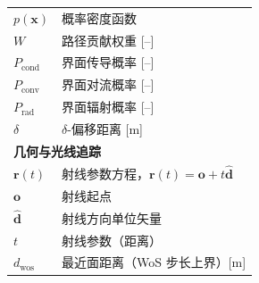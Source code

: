 \begin{appendix*}
\begin{tabular}{p{7em}p{25em}}
		$p(\mathbf{x})$  & 概率密度函数 \\
		$W$              & 路径贡献权重 [--] \\
		$P_{\mathrm{cond}}$ & 界面传导概率 [--] \\
		$P_{\mathrm{conv}}$ & 界面对流概率 [--] \\
		$P_{\mathrm{rad}}$  & 界面辐射概率 [--] \\
		$\delta$         & $\delta$-偏移距离 [m] \\[6pt]
		\multicolumn{2}{l}{\textbf{几何与光线追踪}} \\[3pt]
		$\mathbf{r}(t)$  & 射线参数方程，$\mathbf{r}(t) = \mathbf{o} + t\hat{\mathbf{d}}$ \\
		$\mathbf{o}$     & 射线起点 \\
		$\hat{\mathbf{d}}$ & 射线方向单位矢量 \\
		$t$              & 射线参数（距离）\\
		$d_{\mathrm{wos}}$ & 最近面距离（WoS 步长上界）[m] \\
	\end{tabular}
\end{appendix*}